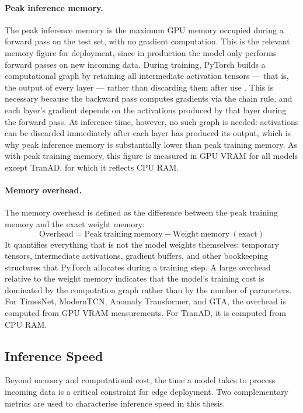 \documentclass[twoside,11pt,openright]{report}
\begin{document}
\paragraph{Peak inference memory.}
The peak inference memory is the maximum GPU memory occupied during a forward pass
on the test set, with no gradient computation. This is the relevant memory figure
for deployment, since in production the model only performs forward passes on new
incoming data. During training, PyTorch builds a 
computational graph by retaining all intermediate activation tensors --- that is, the 
output of every layer --- rather than discarding them after use \citep{pytorch_autograd}. This is necessary because 
the backward pass computes gradients via the chain rule, and each layer's gradient depends 
on the activations produced by that layer during the forward pass. At inference time, 
however, no such graph is needed: activations can be discarded immediately after each 
layer has produced its output, which is why peak inference memory is substantially lower 
than peak training memory. As with peak training 
memory, this figure is measured in GPU VRAM for all models except TranAD, for which it 
reflects CPU RAM.

\paragraph{Memory overhead.}
The memory overhead is defined as the difference between the peak training memory
and the exact weight memory:
\begin{equation}
    \mathrm{Overhead} = \mathrm{Peak\ training\ memory} - \mathrm{Weight\ memory\ (exact)}
\end{equation}
It quantifies everything that is not the model weights themselves: temporary tensors,
intermediate activations, gradient buffers, and other bookkeeping structures that
PyTorch allocates during a training step. A large overhead relative to the weight
memory indicates that the model's training cost is dominated by the computation graph
rather than by the number of parameters. For TimesNet, ModernTCN, Anomaly Transformer,
and GTA, the overhead is computed from GPU VRAM measurements. For TranAD, it is
computed from CPU RAM.


\subsection{Inference Speed}

Beyond memory and computational cost, the time a model takes to process incoming
data is a critical constraint for edge deployment. Two complementary metrics are used to
characterise inference speed in this thesis.
\end{document}
